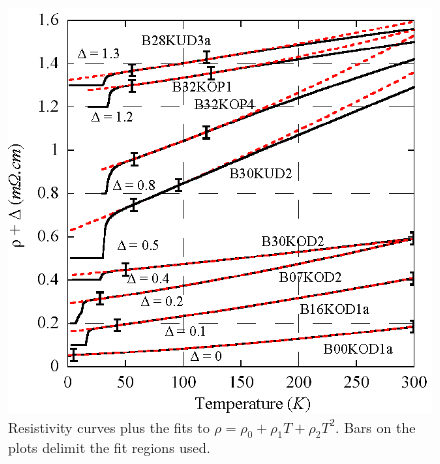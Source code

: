 \begin{figure}[htbp]
    \begin{center}
        \includegraphics[scale=0.9]{Chapter-HallBSCO/Figures/TSweeps/TSweepsPlusFits}
        \caption{Resistivity curves plus the fits to $\rho = \rho_0 + \rho_1T + \rho_2T^2$. Bars on the plots delimit the fit regions used.}
        \label{Fig:ResH:TSweepsPlusFits}
    \end{center}
\end{figure}

